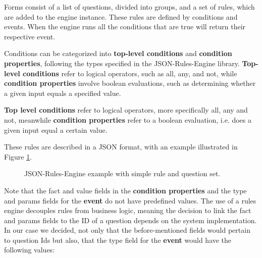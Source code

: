 Forms consist of a list of questions, divided into groups, and a set of rules, which are added to the engine instance. These rules are defined by conditions and events. When the engine runs all the conditions that are true will return their respective event.

Conditions can be categorized into \textbf{top-level conditions} and \textbf{condition properties}, following the types specified in the JSON-Rules-Engine library. \textbf{Top-level conditions} refer to logical operators, such as all, any, and not, while \textbf{condition properties} involve boolean evaluations, such as determining whether a given input equals a specified value.

\textbf{Top level conditions} refer to logical operators, more specifically all, any and not, meanwhile \textbf{condition properties} refer to a boolean evaluation, i.e. does a given input equal a certain value.

These rules are described in a JSON format, with an example illustrated in Figure \ref{fig:jre_diagram}.

\begin{figure}[h]
	\begin{center}
	\end{center}
	\caption{JSON-Rules-Engine example with simple rule and question set.}\label{fig:jre_diagram}
\end{figure}

Note that the fact and value fields in the \textbf{condition properties} and the type and params fields for the \textbf{event} do not have predefined values. The use of a rules engine decouples rules from business logic, meaning the decision to link the fact and params fields to the ID of a question depends on the system implementation.
In our case we decided, not only that the before-mentioned fields would pertain to question Ids but also, that the type field for the \textbf{event} would have the following values:

